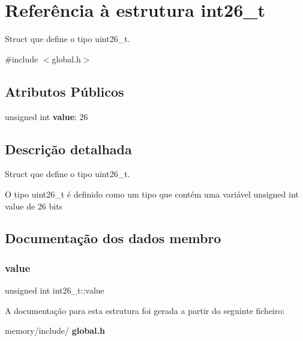 \section{Referência à estrutura int26\+\_\+t}
\label{structint26__t}


Struct que define o tipo uint26\+\_\+t.  




{\ttfamily \#include $<$global.\+h$>$}

\subsection*{Atributos Públicos}
\begin{DoxyCompactItemize}
\item 
unsigned int \textbf{ value}\+: 26
\end{DoxyCompactItemize}


\subsection{Descrição detalhada}
Struct que define o tipo uint26\+\_\+t. 

O tipo uint26\+\_\+t é definido como um tipo que contém uma variável unsigned int value de 26 bits 

\subsection{Documentação dos dados membro}
\mbox{\label{structint26__t_a0a3327e78d0b0acb4f02c9c1e73f6a9e}} 
\subsubsection{value}
{\footnotesize\ttfamily unsigned int int26\+\_\+t\+::value}



A documentação para esta estrutura foi gerada a partir do seguinte ficheiro\+:\begin{DoxyCompactItemize}
\item 
memory/include/\textbf{ global.\+h}\end{DoxyCompactItemize}
